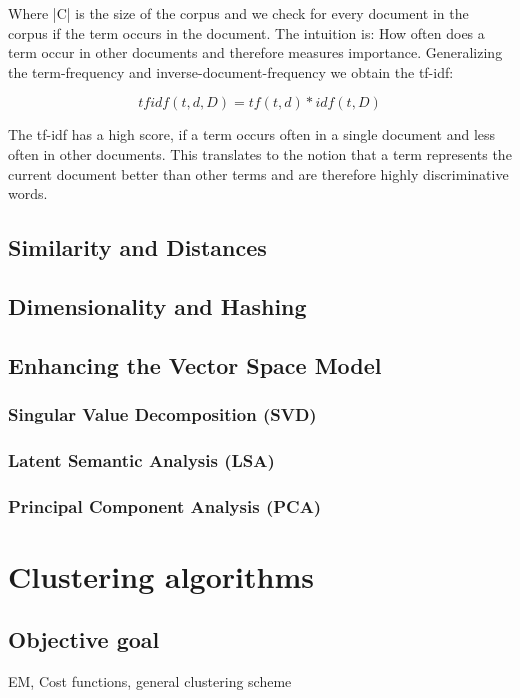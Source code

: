     Where |C| is the size of the corpus and we check for every document in the corpus if the term occurs in the document. The intuition is: How often does a term occur in other documents and therefore measures importance. Generalizing the term-frequency and inverse-document-frequency we obtain the tf-idf:

    \begin{equation}
      tfidf(t, d, D) = tf(t, d) * idf(t, D)
    \end{equation}

    The tf-idf has a high score, if a term occurs often in a single document and less often in other documents. This translates to the notion that a term represents the current document better than other terms and are therefore highly discriminative words.

  \subsection{Similarity and Distances}
  \subsection{Dimensionality and Hashing}

  \subsection{Enhancing the Vector Space Model}
    \subsubsection{Singular Value Decomposition (SVD)}
    \subsubsection{Latent Semantic Analysis (LSA)}
    \subsubsection{Principal Component Analysis (PCA)}

\section{Clustering algorithms}

  \subsection{Objective goal}
    EM, Cost functions, general clustering scheme

